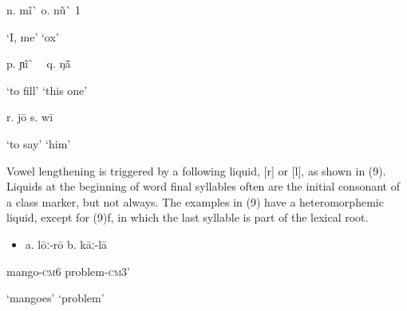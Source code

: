 \begin{styleindexi}
            n.  mĩ\`{}                                                 o.  nũ\`{} 1 
\end{styleindexi}

\begin{styleindexi}
                ‘I, me’                                              ‘ox’                                              
\end{styleindexi}

\begin{styleindexi}
            p.  ɲĩ\`{} ~                                                q.   ŋã\={} 
\end{styleindexi}

\begin{styleindexi}
                 ‘to fill’                                              ‘this one’  
\end{styleindexi}

\begin{styleindexi}
            r.   jō                                                s.   wī              
\end{styleindexi}

\begin{styleindexi}
                 ‘to say’                                            ‘him’
\end{styleindexi}

Vowel lengthening is triggered by a following liquid, [r] or [l], as shown in (9). Liquids at the beginning of word final syllables often are the initial consonant of a class marker, but not always. The examples in (9) have a heteromorphemic liquid, except for (9)f, in which the last syllable is part of the lexical root. 

\begin{itemize}
\item \begin{styleindexi}
       \label{bkm:Ref475789760}a.   lōː-rō                                             b.  kāː-lā           
\end{styleindexi}\end{itemize}
\begin{styleindexi}
                mango-\textsc{cm}6                                        problem-\textsc{cm}3’
\end{styleindexi}

\begin{styleindexi}
                ‘mangoes’                                            ‘problem’
\end{styleindexi}

